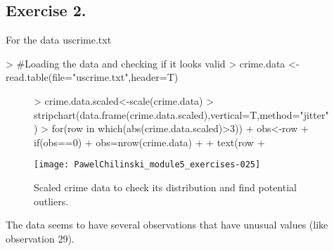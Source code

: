 \documentclass[a4paper]{article}
\begin{document}
\subsection{Exercise 2.} For the data uscrime.txt
\begin{Schunk}
\begin{Sinput}
> #Loading the data and checking if it looks valid
> crime.data <- read.table(file="uscrime.txt",header=T)
\end{Sinput}
\end{Schunk}
\begin{figure}[H]
\begin{center}
\begin{Schunk}
\begin{Sinput}
> crime.data.scaled<-scale(crime.data)
> stripchart(data.frame(crime.data.scaled),vertical=T,method="jitter")
> for(row in which(abs(crime.data.scaled)>3)){
+ 	obs<-row %% nrow(crime.data)
+ 	if(obs==0){
+ 		obs=nrow(crime.data)
+ 	}
+ 	text(row%/%nrow(crime.data)+1.3,crime.data.scaled[row],obs)
+ }
\end{Sinput}
\end{Schunk}
\texttt{[image: PawelChilinski\_module5\_exercises-025]}
\caption{Scaled crime data to check its distribution and find potential outliers.}
\end{center}
\end{figure}
The data seems to have several observations that have unusual values
(like observation 29).
\end{document}
